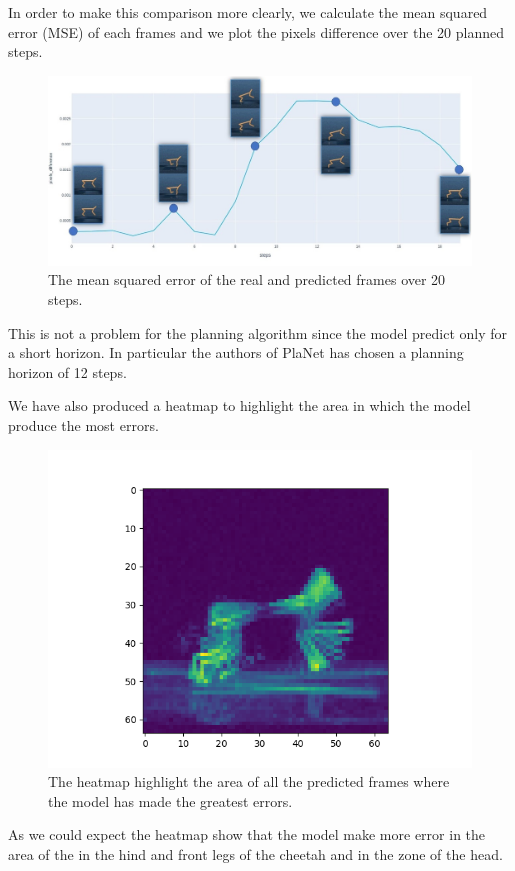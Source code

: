 In order to make this comparison more clearly, we calculate the mean squared error (MSE) of each frames and we plot the pixels difference over the 20 planned steps.

\begin{figure}[H]
\centering
\includegraphics[width=1. \textwidth, height=.35\textheight]{pictures/pixels_difference}
\caption{The mean squared error of the real and predicted frames over 20 steps.}
\end{figure}
This is not a problem for the planning algorithm since the model predict only for a short horizon. In particular the authors of PlaNet has chosen a planning horizon of 12 steps.

We have also produced a heatmap to highlight the area in which the model produce the most errors.

\begin{figure}[H]
\centering
\includegraphics[width=1. \textwidth, height=.45\textheight]{pictures/heatmap}
\caption{The heatmap highlight the area of all the predicted frames where the model has made the greatest errors.}
\end{figure}
As we could expect the heatmap show that the model make more error in the area of the in the hind and front legs of the cheetah and in the zone of the head.

